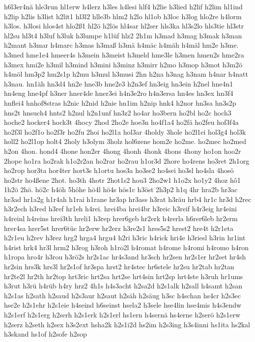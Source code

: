 {h6l3er4nä
hle3run
hl1erw
h4lerz
h3les
h4lesi
hlf4
h2lie
h3lied
h2lif
h2lim
hl1ind
h2lip
h2lis
h3list
h2lit1
hl3l2
hlle3b
hlm2
h2lo
hl1ob
h3loc
h3log
hlo2re
h4lorm
h3los.
h3losi
hlos4st
hlo2ß1
hl2ö
h2lös
hl4sar
hl2ser
hls3ka
hl3s2lo
hls3tie
hl3str
hl2su
hl3t4
h3luf
h3luk
h3lumpe
h1lüf
hlz2
2h1m
h3mad
h3mag
h3mak
h3man
h2mant
h3mar
h4marc
h3mas
h3maß
h3mä
h4mäc
h4mäh
h4mäl
hm2e
h3me.
h3med
hme1e4
hmeer4s
h3mein
h3meist
h3meld
hme3le
h3men
hmen2s
hme2ra
h3mex
hmi2e
h3mil
h3mind
h3mini
h3minz
h3mirr
h2mo
h3mop
h3mot
h3m2ö
h4möl
hm3p2
hm2s1p
h2mu
h3mul
h3musi
2hn
h2na
h3nag
h3nam
h4nar
h4natt
h3nau.
hn1äh
hn3d4
hn2e
hne3b
hne2e3
h2n3ef
hn3eig
hn3ein
h2nel
hne4n1
hn4eng
hne4pf
h3ner
hner4de
hner3ei
h4n3e2ro
h4n3ersa
hn4es
hn3ex
hn3f4
hnflei4
hnhof8stras
h2nic
h2nid
h2nie
hn1im
h2nip
hnk4
h2nor
hn3sa
hn3s2p
hns2t
hnsuch4
hnts2
h2nul
h2n1unf
hn3z2
ho4ar
ho3bern
ho2bl
ho2c
hoch3
hoche2
hocker4
hock3t
4hocy
2hod
2ho2e
hoe3n
ho4f1a4
ho2fä
ho2feu
hof3f4a
ho2f3l
ho2f1o
ho2f3r
ho2fu
2hoi
ho2l1a
hol3ar
4holdy
3hole
ho2l1ei
hol3g4
hol3k
holl2
ho2l1op
holt4
2holy
h3olym
3holz
hol6zene
hom2e
ho2me.
ho2mec
ho2med
h2on
4hon.
hond4
4hone
hon2er
4hong
4honh
4honk
4hons
4hony
ho1on
hoo2r
2hope
ho1ra
ho2rak
h1o2r2an
ho2rar
ho2rau
h1or3d
2hore
ho4rens
ho3ret
2h1org
ho2rop
hor3ta
hor4ter
hort3s
h1ortu
hos3a
ho3se2
ho4sei
ho3sl
ho4sla
4hosö
ho2str
ho4ßene
2hot.
ho3th
4hotr
2hot1s2
hou3
2ho2w1
h1o2x
ho1y2
4hoz
hô1
1h2ö
2hö.
hö2c
h4öh
5höhe
hö4l
hö4s
hös1c
h3öst
2h3p2
h1q
4hr
hra2b
hr3ac
hr3ad
hr1a2g
h1r4ah
h1rai
h1rane
hr3ap
hr3ass
h3rat
h3räu
hrb4
hr1c
hr3d
h2rec
h3r2ech
h3red
h3ref
hr1eh
h4rei.
hrei4ba
hrei4br
h3reic
h3reif
h4r3eig
hr4eini
h4reinl
h4reins
hrei3th
hreli1
h3rep
hrer6geb
hr2erk
h4rerla
h6rer6leb
hr2erm
hrer4sa
hrer5st
hrer6tüc
hr2erw
hr2erz
h3re2s1
hres5s2
hrest2
hre4t
h2r1eta
h2r1eu
h2rev
h3rez
hrg2
hrga4
hrgu4
h2ri
h3ric
h4rick
hri4e
h3riesl
h3rin
hr1int
h4rist
hrk4
hr3l
hrm2
h3rog
h3roh
h1ro2l
h4romat
h4rome
h4romi
h4romo
h4ron
h1ropa
hro4r
h3rou
h3rö2s
hr2s1ac
hr4s3and
hr3sch
hr2sen
hr2s1er
hr2set
hr4sh
hr2sin
hrs3k
hrs3l
hr2s1of
hr3spa
hrst2
hr4stec
hr6stele
hr2su
hr2tab
hr2tan
hr2te2l
hr2th
hr2top
hrt3ric
hrt2sa
hrt2se
hrt4sin
hrt2sp
hrt4ste
h3ruh
hr1ums
h3rut
h3rü
h4rüb
h4ry
hrz2
4h1s
h4s3acht
h2sa2d
h2s1alk
h2sall
h4samt
h2san
h2s1as
h2sath
h2saud
h2s3aur
h2saut
h2säh
h2säug
h3sc
h4schan
hs4cr
h2s3ec
hse2e
h2s1ehr
h2s1eie
h4seind
h6seinst
hsela2
h3sele
hse4lin
hse4mis
h4s3endw
h2s1erf
h2s1erg
h2serh
h2s1erk
h2s1erl
hs1ern
h4sernä
hs4erne
h2serö
h2s1erw
h2serz
h2seth
h2sex
h3s2ext
hsha2k
h2s1i2d
hs2im
h2s3ing
h3s4inni
hs1ita
hs2kal
h3skand
hs1of
h2sofe
h2sop
}
